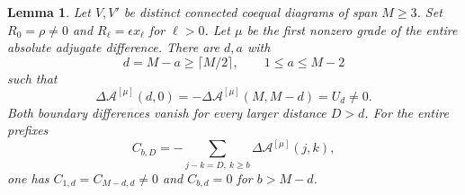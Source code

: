 \documentclass[11pt,a4paper]{amsart}
\numberwithin{equation}{section}
\theoremstyle{plain}
\newtheorem{lemma}[theorem]{Lemma}
\theoremstyle{definition}
\begin{document}
\begin{lemma}\label{ph:first-grade}
Let \(V,V'\) be distinct connected coequal diagrams of span \(M\ge3\).
Set \(R_0=\rho\ne0\) and \(R_\ell=\epsilon x_\ell\) for \(\ell>0\).
Let \(\mu\) be the first nonzero grade of the entire absolute adjugate
difference.  There are \(d,a\) with
\[
 d=M-a\ge\lceil M/2\rceil,\qquad1\le a\le M-2
\]
such that
\begin{equation}\label{ord:extreme-boundaries}
 \Delta\mathcal A^{[\mu]}(d,0)
 =-\Delta\mathcal A^{[\mu]}(M,M-d)=U_d\ne0.
\end{equation}
Both boundary differences vanish for every larger distance \(D>d\).
For the entire prefixes
\[
 C_{b,D}=-\sum_{j-k=D,\ k\ge b}\Delta\mathcal A^{[\mu]}(j,k),
\]
one has \(C_{1,d}=C_{M-d,d}\ne0\) and
\(C_{b,d}=0\) for \(b>M-d\).
\end{lemma}
\end{document}

